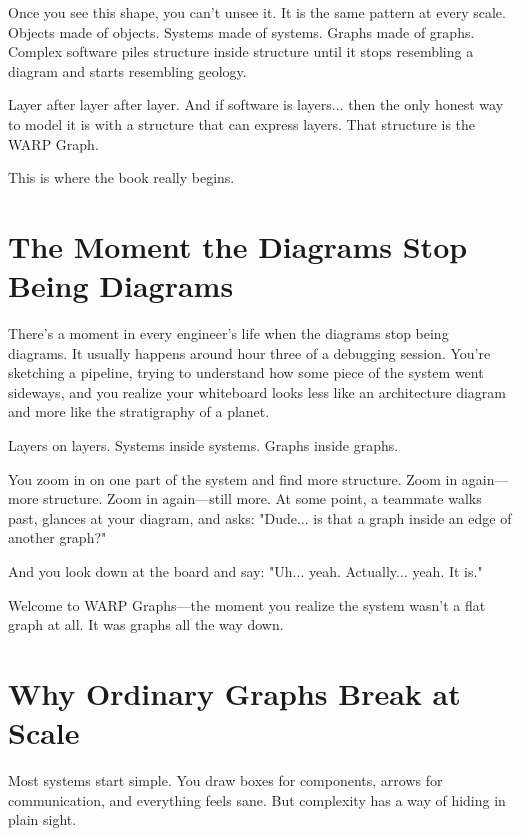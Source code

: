 Once you see this shape, you can't unsee it. It is the same pattern at every scale. Objects made of objects. Systems made of systems. Graphs made of graphs. Complex software piles structure inside structure until it stops resembling a diagram and starts resembling geology.

Layer after layer after layer. And if software is layers... then the only honest way to model it is with a structure that can express layers. That structure is the WARP Graph.

This is where the book really begins.

\section{The Moment the Diagrams Stop Being Diagrams}
\label{sec:diagrams-stop}

There's a moment in every engineer's life when the diagrams stop being diagrams. It usually happens around hour three of a debugging session. You're sketching a pipeline, trying to understand how some piece of the system went sideways, and you realize your whiteboard looks less like an architecture diagram and more like the stratigraphy of a planet.

Layers on layers. Systems inside systems. Graphs inside graphs.

You zoom in on one part of the system and find more structure. Zoom in again—more structure. Zoom in again—still more. At some point, a teammate walks past, glances at your diagram, and asks: "Dude... is that a graph inside an edge of another graph?"

And you look down at the board and say: "Uh... yeah. Actually... yeah. It is."

Welcome to WARP Graphs—the moment you realize the system wasn't a flat graph at all. It was graphs all the way down.

\section{Why Ordinary Graphs Break at Scale}
\label{sec:graphs-break}

Most systems start simple. You draw boxes for components, arrows for communication, and everything feels sane. But complexity has a way of hiding in plain sight.

